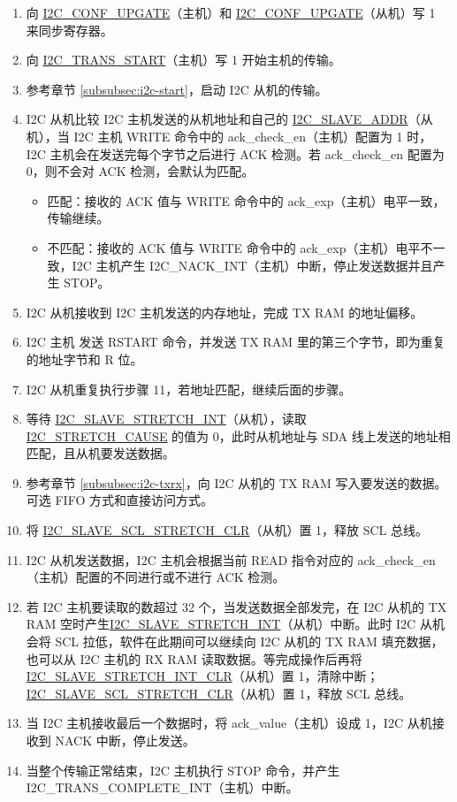 \documentclass[main\_\_CN.tex]{subfiles}
\begin{document}
\begin{enumerate}
\item 向 \hyperref[fielddesc:I2CCONFUPGATE]{I2C\_CONF\_UPGATE}（主机）和 \hyperref[fielddesc:I2CCONFUPGATE]{I2C\_CONF\_UPGATE}（从机）写 1 来同步寄存器。
\item 向 \hyperref[fielddesc:I2CTRANSSTART]{I2C\_TRANS\_START}（主机）写 1 开始主机的传输。
\item 参考章节 \ref{subsubsec:i2c-start}，启动 I2C 从机的传输。


\item I2C 从机比较 I2C 主机发送的从机地址和自己的 \hyperref[fielddesc:I2CSLAVEADDR]{I2C\_SLAVE\_ADDR}（从机），当 I2C 主机 WRITE 命令中的 ack\_check\_en（主机）配置为 1 时，I2C 主机会在发送完每个字节之后进行 ACK 检测。若 ack\_check\_en 配置为 0，则不会对 ACK 检测，会默认为匹配。
\begin{itemize}
\item 匹配：接收的 ACK 值与 WRITE 命令中的 ack\_exp（主机）电平一致，传输继续。
\item 不匹配：接收的 ACK 值与 WRITE 命令中的 ack\_exp（主机）电平不一致，I2C 主机产生 I2C\_NACK\_INT（主机）中断，停止发送数据并且产生 STOP。
\end{itemize}
\item I2C 从机接收到 I2C 主机发送的内存地址，完成 TX RAM 的地址偏移。
\item I2C 主机 发送 RSTART 命令，并发送 TX RAM 里的第三个字节，即为重复的地址字节和 R 位。
\item I2C 从机重复执行步骤 11，若地址匹配，继续后面的步骤。

\item 等待 \hyperref[int:i2c-slave-stretch]{I2C\_SLAVE\_STRETCH\_INT}（从机），读取 \hyperref[fielddesc:I2CSTRETCHCAUSE]{I2C\_STRETCH\_CAUSE} 的值为 0，此时从机地址与 SDA 线上发送的地址相匹配，且从机要发送数据。

\item 参考章节 \ref{subsubsec:i2c-txrx}，向 I2C 从机的 TX RAM 写入要发送的数据。可选 FIFO 方式和直接访问方式。
\item 将 \hyperref[fielddesc:I2CSLAVESCLSTRETCHCLR]{I2C\_SLAVE\_SCL\_STRETCH\_CLR}（从机）置 1，释放 SCL 总线。


\item I2C 从机发送数据，I2C 主机会根据当前 READ 指令对应的 ack\_check\_en（主机）配置的不同进行或不进行 ACK 检测。
\item 若 I2C 主机要读取的数超过 32 个，当发送数据全部发完，在 I2C 从机的 TX RAM 空时产生\hyperref[int:i2c-slave-stretch]{I2C\_SLAVE\_STRETCH\_INT}（从机）中断。此时 I2C 从机会将 SCL 拉低，软件在此期间可以继续向 I2C 从机的 TX RAM 填充数据，也可以从 I2C 主机的 RX RAM 读取数据。等完成操作后再将\hyperref[fielddesc:I2CSLAVESTRETCHINTCLR]{I2C\_SLAVE\_STRETCH\_INT\_CLR}（从机）置 1，清除中断；\hyperref[fielddesc:I2CSLAVESCLSTRETCHCLR]{I2C\_SLAVE\_SCL\_STRETCH\_CLR}（从机）置 1，释放 SCL 总线。

\item 当 I2C 主机接收最后一个数据时，将 ack\_value（主机）设成 1，I2C 从机接收到 NACK 中断，停止发送。

\item 当整个传输正常结束，I2C 主机执行 STOP 命令，并产生 I2C\_TRANS\_COMPLETE\_INT（主机）中断。
\end{enumerate}
\end{document}
